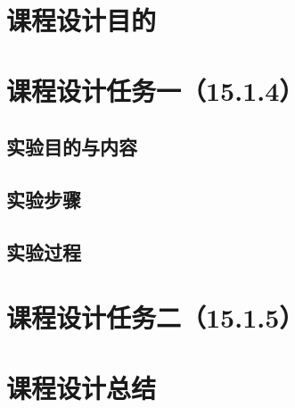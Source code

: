\documentclass{course-thesis/theme-2639012-final}
\begin{document}

\makecover


\section{课程设计目的}

\section{课程设计任务一（15.1.4）}

\subsection{实验目的与内容}

\subsection{实验步骤}


\subsection{实验过程}

\section{课程设计任务二（15.1.5）}

\section{课程设计总结}

\end{document}
